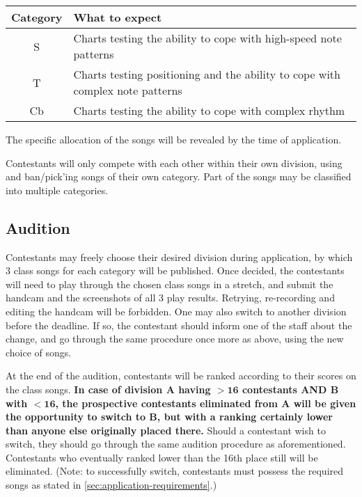\documentclass{article}
\newcommand{\alert}[1]{{\color{red} #1}}
\begin{document}
\begin{table}[!htbp]
	\centering
	\begin{tabular}{cl}
		\hline
		Category & What to expect                                                                \\ \hline
		S        & Charts testing the ability to cope with high-speed note patterns              \\
		T        & Charts testing positioning and the ability to cope with complex note patterns \\
		Cb       & Charts testing the ability to cope with complex rhythm                        \\ \hline
	\end{tabular}
\end{table}

\alert{
	The specific allocation of the songs  %
	will be revealed by the time of application.
}

Contestants will only compete with each other
within their own division,
using and ban/pick'ing songs of their own category.
Part of the songs may be classified into multiple categories.

\subsection{Audition}

Contestants may freely choose their desired division
during application,
by which 3 class songs for each category will be published.
Once decided, the contestants will need to play through the chosen class songs in a stretch,
and submit the handcam and the screenshots of all 3 play results.
Retrying, re-recording and editing the handcam will be forbidden.
One may also switch to another division before the deadline.
If so, the contestant should inform one of the staff about the change,
and go through the same procedure once more as above,
using the new choice of songs.

At the end of the audition,
contestants will be ranked
according to their scores on the class songs.
\textbf{In case of division A having $\mathbf{> 16}$ contestants
	AND B with $\mathbf{< 16}$,
	the prospective contestants eliminated from A
	will be given the opportunity to switch to B,
	but with a ranking certainly lower than
	anyone else originally placed there.}
Should a contestant wish to switch,
they should go through the same
audition procedure as aforementioned.
Contestants who eventually ranked lower than the 16th place
still will be eliminated.
(Note: to successfully switch, contestants
must possess the required songs
as stated in \cref{sec:application-requirements}.)
\end{document}
